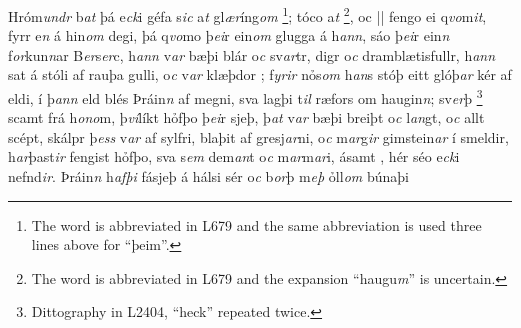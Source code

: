 Hróm\textit{undr} b\textit{at} þá e\textit{ck}i géfa  s\textit{ic} 
a\textit{t}  gl\textit{ær}íng\textit{om}  \footnote{The word is abbreviated in L679 and the same abbreviation is used three lines above for \enquote{þeim}.}; tóco   a\textit{t}  \footnote{The word is abbreviated in L679 and the expansion \enquote{haugu\textit{m}} is uncertain.}, oc 
||
 fengo ei   q\textit{vo}m\textit{it}, fyrr e\textit{n} á hin\textit{om}  degi, þá  q\textit{vo}mo þ\textit{ei}r ein\textit{om} glugga á
h\textit{ann}, sáo þ\textit{ei}r   ein\textit{n}  f\textit{or}kun\textit{n}ar   B\textit{er}s\textit{er}c, 
h\textit{ann} v\textit{ar} bæþi blár o\textit{c} sv\textit{ar}tr, digr o\textit{c} dramblætisfullr,
h\textit{ann} sat á stóli af rauþa gulli, o\textit{c} v\textit{ar} klæþdor  ; 
f\textit{yrir} nỏs\textit{om} h\textit{an}s stóþ eitt   glóþ\textit{ar} kér  af
  eldi, í
þ\textit{an}\textit{n} eld blés Þráin\textit{n} af megni, sva    lagþi t\textit{il}  ræfors  om haugin\textit{n}; sv\textit{er}þ  \footnote{Dittography in L2404, \enquote{heck} repeated twice.}  scamt  frá
h\textit{ono}m, þ\textit{ví}líkt hỏfþo þ\textit{ei}r   sjeþ, 
þ\textit{at} v\textit{ar} bæþi breiþt  o\textit{c}
l\textit{an}gt, o\textit{c} allt   scépt, skálpr  
þ\textit{ess} v\textit{ar} af sylfri, blaþit   af   gresj\textit{ar}ni,
o\textit{c} m\textit{ar}g\textit{ir}  gimstein\textit{ar} í smeldir,   h\textit{ar}þast\textit{ir} fengist hỏfþo, sva s\textit{em}
dem\textit{an}t o\textit{c} m\textit{ar}m\textit{ar}i, ásamt  ,   hér séo e\textit{ck}i nefnd\textit{ir}. Þráin\textit{n} h\textit{afþi}  fásjeþ   á hálsi sér o\textit{c} b\textit{or}þ m\textit{eþ} ỏll\textit{om} búnaþi
